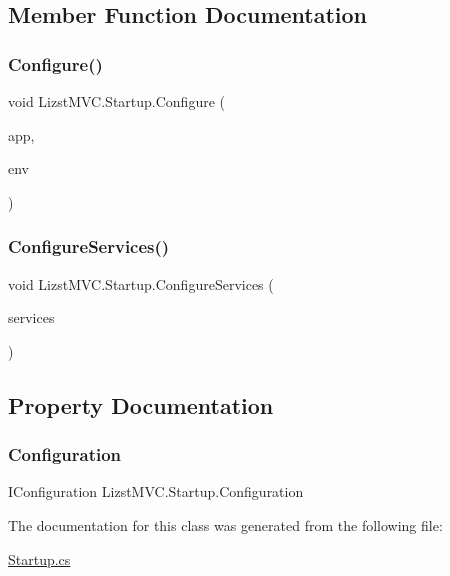 \subsection{Member Function Documentation}
\mbox{\label{class_lizst_m_v_c_1_1_startup_a9dd901440accd8a86d0deda9e8086d3d}} 
\subsubsection{\texorpdfstring{Configure()}{Configure()}}
{\footnotesize\ttfamily void Lizst\+M\+V\+C.\+Startup.\+Configure (\begin{DoxyParamCaption}\item[{I\+Application\+Builder}]{app,  }\item[{I\+Hosting\+Environment}]{env }\end{DoxyParamCaption})}

\mbox{\label{class_lizst_m_v_c_1_1_startup_abe6142263e61bb76fdff62e7b5574690}} 
\subsubsection{\texorpdfstring{ConfigureServices()}{ConfigureServices()}}
{\footnotesize\ttfamily void Lizst\+M\+V\+C.\+Startup.\+Configure\+Services (\begin{DoxyParamCaption}\item[{I\+Service\+Collection}]{services }\end{DoxyParamCaption})}



\subsection{Property Documentation}
\mbox{\label{class_lizst_m_v_c_1_1_startup_a4cee12de48dfde0d438ff2f1afdfa9c3}} 
\subsubsection{\texorpdfstring{Configuration}{Configuration}}
{\footnotesize\ttfamily I\+Configuration Lizst\+M\+V\+C.\+Startup.\+Configuration\hspace{0.3cm}{\ttfamily [get]}}



The documentation for this class was generated from the following file\+:\begin{DoxyCompactItemize}
\item 
\mbox{\hyperlink{_startup_8cs}{Startup.\+cs}}\end{DoxyCompactItemize}
